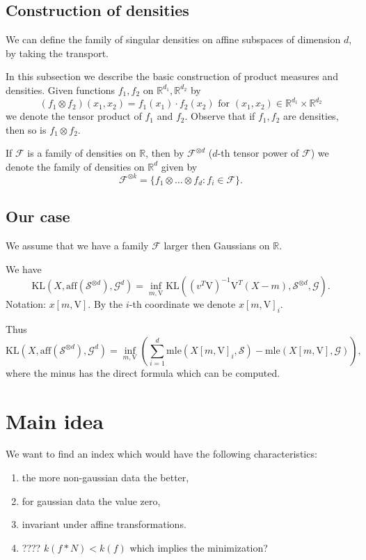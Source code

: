 \documentclass[12pt]{article}
\def\R{\mathbb{R}}
\def\v{\mathrm{V}}
\def\F{\mathcal{F}}
\def\G{\mathcal{G}}
\def\S{\mathcal{S}}
\def\KL{\mathrm{KL}}
\def\for{\mbox{  for }}
\def\mle{\mathrm{mle}}
\def\aff{\mathrm{aff}}
\theoremstyle{definition}
\begin{document}
\subsection{Construction of densities}

We can define the family of singular densities on affine subspaces of 
dimension $d$, by taking the transport.


In this subsection we describe the basic construction of product measures and densities. Given functions $f_1,f_2$ on $\R^{d_1},\R^{d_2}$ by 
$$
(f_1 \otimes f_2)(x_1,x_2)=f_1(x_1) \cdot f_2(x_2) \for (x_1,x_2) \in \R^{d_1} 
\times \R^{d_2}
$$ 
we denote the tensor
product of $f_1$ and $f_2$. Observe that if $f_1,f_2$ are densities, then so is
$f_1 \otimes f_2$.

If $\F$ is a family of densities on $\R$, then by $\F^{\otimes d}$ ($d$-th tensor power of $\F$) we denote
the family of densities on $\R^d$ given by
$$
\F^{\otimes k}=\{f_1 \otimes \ldots \otimes f_d : f_i \in \F\}.
$$




\subsection{Our case}

We assume that we have a family $\F$ larger then Gaussians on $\R$.

We have
$$
\KL(X,\aff(\S^{\otimes d}),\G^d)=\inf_{m,\v} \KL((v^T\v)^{-1}\v^T(X-m),\S^{\otimes d},\G).
$$
Notation: $x[m,\v]$. By the $i$-th coordinate we denote $x[m,\v]_i$.

Thus 
$$
\KL(X,\aff(\S^{\otimes d}),\G^d)=\inf_{m,\v} \left( \sum_{i=1}^d \mle(X[m,\v]_i,\S)
-\mle(X[m,\v],\G)
\right),
$$
where the minus has the direct formula which can be computed.


\section{Main idea}

We want to find an index which would have the following characteristics:
\begin{enumerate}
\item the more non-gaussian data the better,
\item for gaussian data the value zero,
\item invariant under affine transformations.
\item ???? $k(f * N) <k(f)$ which implies the minimization?
\end{enumerate}
\end{document}

